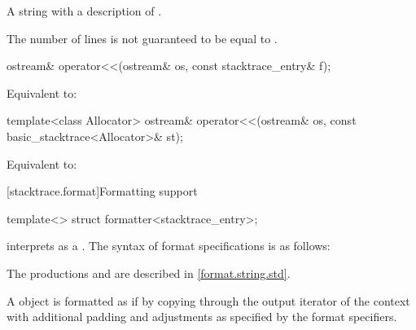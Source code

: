 \begin{itemdescr}
\pnum
\returns
A string with a description of .
\begin{note}
The number of lines is not guaranteed to be equal to .
\end{note}
\end{itemdescr}

%
\begin{itemdecl}
ostream& operator<<(ostream& os, const stacktrace_entry& f);
\end{itemdecl}

\begin{itemdescr}
\pnum
\effects
Equivalent to: 
\end{itemdescr}

%
\begin{itemdecl}
template<class Allocator>
  ostream& operator<<(ostream& os, const basic_stacktrace<Allocator>& st);
\end{itemdecl}

\begin{itemdescr}
\pnum
\effects
Equivalent to: 
\end{itemdescr}

[stacktrace.format]{Formatting support}

\begin{itemdecl}
template<> struct formatter<stacktrace_entry>;
\end{itemdecl}

\begin{itemdescr}
\pnum
{} interprets 
as a .
The syntax of format specifications is as follows:

\begin{ncbnf}
\br
     
\end{ncbnf}

\begin{note}
The productions  and 
are described in \ref{format.string.std}.
\end{note}

\pnum
A  object  is formatted as if by
copying  through the output iterator of the context
with additional padding and adjustments as specified by the format specifiers.
\end{itemdescr}


